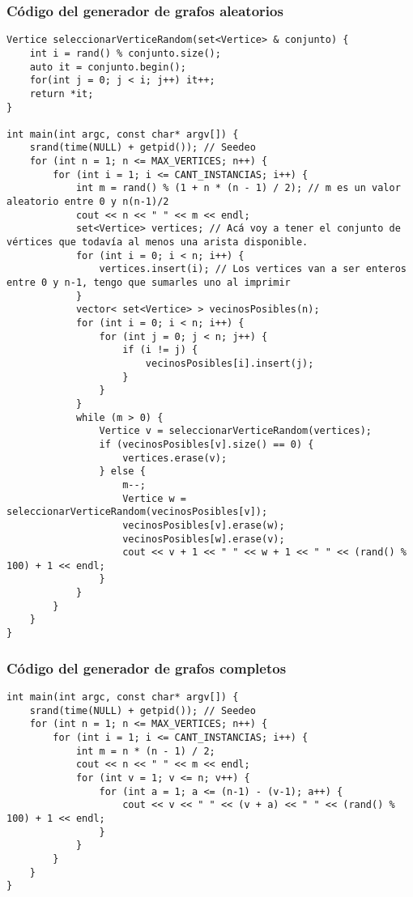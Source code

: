 \subsubsection{Código del generador de grafos aleatorios}
\begin{lstlisting}[frame=single]
Vertice seleccionarVerticeRandom(set<Vertice> & conjunto) {
    int i = rand() % conjunto.size();
    auto it = conjunto.begin();
    for(int j = 0; j < i; j++) it++;
    return *it;
}

int main(int argc, const char* argv[]) {
    srand(time(NULL) + getpid()); // Seedeo
    for (int n = 1; n <= MAX_VERTICES; n++) {
        for (int i = 1; i <= CANT_INSTANCIAS; i++) {
            int m = rand() % (1 + n * (n - 1) / 2); // m es un valor aleatorio entre 0 y n(n-1)/2
            cout << n << " " << m << endl;
            set<Vertice> vertices; // Acá voy a tener el conjunto de vértices que todavía al menos una arista disponible.
            for (int i = 0; i < n; i++) {
                vertices.insert(i); // Los vertices van a ser enteros entre 0 y n-1, tengo que sumarles uno al imprimir
            }
            vector< set<Vertice> > vecinosPosibles(n);
            for (int i = 0; i < n; i++) {
                for (int j = 0; j < n; j++) {
                    if (i != j) {
                        vecinosPosibles[i].insert(j);
                    }
                }
            }
            while (m > 0) {
                Vertice v = seleccionarVerticeRandom(vertices);
                if (vecinosPosibles[v].size() == 0) {
                    vertices.erase(v);
                } else {
                    m--;
                    Vertice w = seleccionarVerticeRandom(vecinosPosibles[v]);
                    vecinosPosibles[v].erase(w);
                    vecinosPosibles[w].erase(v);
                    cout << v + 1 << " " << w + 1 << " " << (rand() % 100) + 1 << endl;
                }
            }
        }
    }
}
\end{lstlisting}
\subsubsection{Código del generador de grafos completos}
\begin{lstlisting}[frame=single]
int main(int argc, const char* argv[]) {
    srand(time(NULL) + getpid()); // Seedeo
    for (int n = 1; n <= MAX_VERTICES; n++) {
        for (int i = 1; i <= CANT_INSTANCIAS; i++) {
            int m = n * (n - 1) / 2;
            cout << n << " " << m << endl;
            for (int v = 1; v <= n; v++) {
                for (int a = 1; a <= (n-1) - (v-1); a++) {
                    cout << v << " " << (v + a) << " " << (rand() % 100) + 1 << endl;
                }
            }
        }
    }
}
\end{lstlisting}

